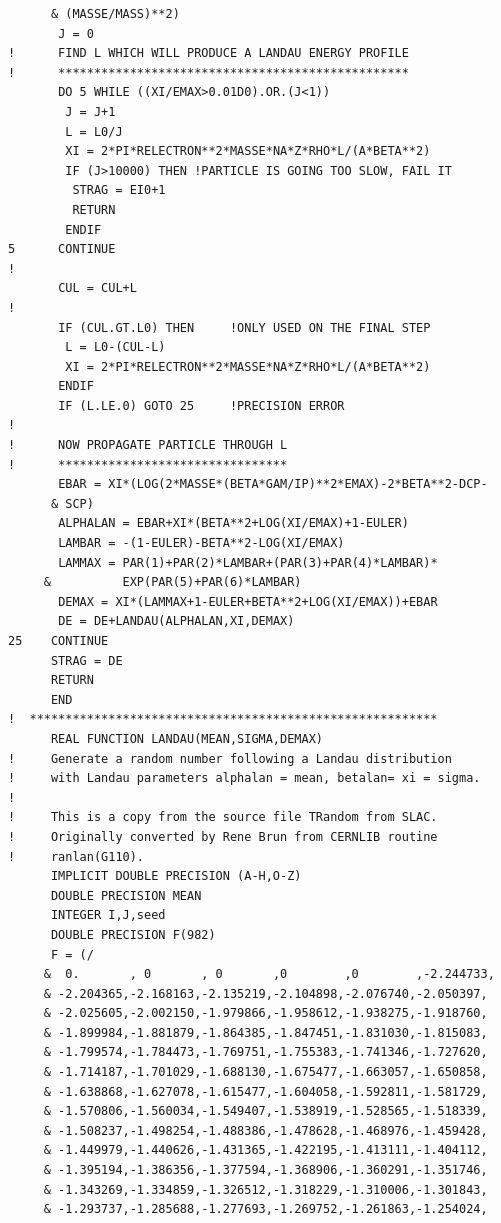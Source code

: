 \begin{lstlisting}
      & (MASSE/MASS)**2)
       J = 0
!      FIND L WHICH WILL PRODUCE A LANDAU ENERGY PROFILE
!      *************************************************
       DO 5 WHILE ((XI/EMAX>0.01D0).OR.(J<1))
        J = J+1
        L = L0/J
        XI = 2*PI*RELECTRON**2*MASSE*NA*Z*RHO*L/(A*BETA**2)
        IF (J>10000) THEN !PARTICLE IS GOING TOO SLOW, FAIL IT
         STRAG = EI0+1
         RETURN
        ENDIF 
5      CONTINUE      
!
       CUL = CUL+L
!
       IF (CUL.GT.L0) THEN     !ONLY USED ON THE FINAL STEP       
        L = L0-(CUL-L)
        XI = 2*PI*RELECTRON**2*MASSE*NA*Z*RHO*L/(A*BETA**2)
       ENDIF
       IF (L.LE.0) GOTO 25     !PRECISION ERROR
!
!      NOW PROPAGATE PARTICLE THROUGH L
!      ********************************
       EBAR = XI*(LOG(2*MASSE*(BETA*GAM/IP)**2*EMAX)-2*BETA**2-DCP-
      & SCP)
       ALPHALAN = EBAR+XI*(BETA**2+LOG(XI/EMAX)+1-EULER)
       LAMBAR = -(1-EULER)-BETA**2-LOG(XI/EMAX)
       LAMMAX = PAR(1)+PAR(2)*LAMBAR+(PAR(3)+PAR(4)*LAMBAR)*
     &          EXP(PAR(5)+PAR(6)*LAMBAR)
       DEMAX = XI*(LAMMAX+1-EULER+BETA**2+LOG(XI/EMAX))+EBAR       
       DE = DE+LANDAU(ALPHALAN,XI,DEMAX)
25    CONTINUE
      STRAG = DE
      RETURN
      END
!  *********************************************************
      REAL FUNCTION LANDAU(MEAN,SIGMA,DEMAX)
!     Generate a random number following a Landau distribution
!     with Landau parameters alphalan = mean, betalan= xi = sigma.
!
!     This is a copy from the source file TRandom from SLAC.
!     Originally converted by Rene Brun from CERNLIB routine 
!     ranlan(G110).
      IMPLICIT DOUBLE PRECISION (A-H,O-Z)
      DOUBLE PRECISION MEAN
      INTEGER I,J,seed
      DOUBLE PRECISION F(982)
      F = (/
     &  0.       , 0       , 0       ,0        ,0        ,-2.244733,
     & -2.204365,-2.168163,-2.135219,-2.104898,-2.076740,-2.050397,
     & -2.025605,-2.002150,-1.979866,-1.958612,-1.938275,-1.918760,
     & -1.899984,-1.881879,-1.864385,-1.847451,-1.831030,-1.815083,
     & -1.799574,-1.784473,-1.769751,-1.755383,-1.741346,-1.727620,
     & -1.714187,-1.701029,-1.688130,-1.675477,-1.663057,-1.650858,
     & -1.638868,-1.627078,-1.615477,-1.604058,-1.592811,-1.581729,
     & -1.570806,-1.560034,-1.549407,-1.538919,-1.528565,-1.518339,
     & -1.508237,-1.498254,-1.488386,-1.478628,-1.468976,-1.459428,
     & -1.449979,-1.440626,-1.431365,-1.422195,-1.413111,-1.404112,
     & -1.395194,-1.386356,-1.377594,-1.368906,-1.360291,-1.351746,
     & -1.343269,-1.334859,-1.326512,-1.318229,-1.310006,-1.301843,
     & -1.293737,-1.285688,-1.277693,-1.269752,-1.261863,-1.254024,

\end{lstlisting}
